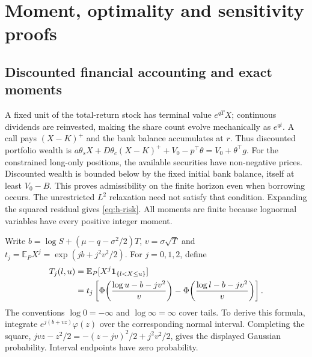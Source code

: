 \documentclass[11pt]{article}
\begin{document}
\appendix
\section{Moment, optimality and sensitivity proofs}
\label{app:h-proofs}

\subsection{Discounted financial accounting and exact moments}

A fixed unit of the total-return stock has terminal value $e^{qT}X$;
continuous dividends are reinvested, making the share count evolve
mechanically as $e^{qt}$. A call pays $(X-K)^+$ and the
bank balance accumulates at $r$. Thus discounted portfolio wealth is
$a\theta_sX+D\theta_c(X-K)^++V_0-p^\top\theta
=V_0+\theta^\top g$. For the constrained long-only positions,
the available securities have non-negative prices. Discounted wealth
is bounded below by the fixed initial bank balance, itself at least
$V_0-B$. This proves admissibility on the finite horizon even when
borrowing occurs. The unrestricted $L^2$ relaxation need not satisfy
that condition. Expanding the squared residual gives \eqref{eq:h-risk}.
All moments are finite because lognormal variables have every positive
integer moment.

Write $b=\log S+(\mu-q-\sigma^2/2)T$, $v=\sigma\sqrt T$ and
$t_j=\mathbb E_PX^j=\exp(jb+j^2v^2/2)$. For $j=0,1,2$, define
\begin{align}
 T_j(l,u)&=\mathbb E_P[X^j{\bf1}_{\{l<X\leq u\}}]\notag\\
 &=t_j\left[
 \Phi\!\left(\frac{\log u-b-jv^2}{v}\right)-
 \Phi\!\left(\frac{\log l-b-jv^2}{v}\right)\right].
 \label{eq:h-truncated-moment}
\end{align}
The conventions $\log0=-\infty$ and $\log\infty=\infty$ cover tails.
To derive this formula, integrate $e^{j(b+vz)}\varphi(z)$ over the
corresponding normal interval. Completing the square,
$jvz-z^2/2=-(z-jv)^2/2+j^2v^2/2$, gives the displayed Gaussian
probability. Interval endpoints have zero probability.
\end{document}
